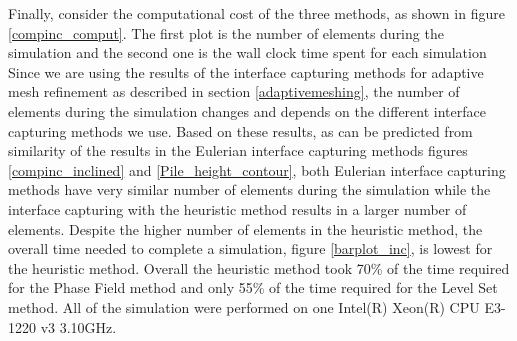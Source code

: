 \documentclass[letterpaper,10pt]{article}
\begin{document}
Finally, consider the computational cost of the three methods, as shown in figure \ref{compinc_comput}.
The first plot is the number of elements during the simulation and the second one is the wall clock time spent for each simulation
Since we are using the results of the interface capturing methods for adaptive mesh refinement as described in section \ref{adaptivemeshing}, 
the number of elements during the simulation changes and depends on the different interface capturing methods we use. 
Based on these results, as can be predicted from similarity of the results in the Eulerian interface capturing methods figures \ref{compinc_inclined} 
and \ref{Pile_height_contour}, both Eulerian interface capturing methods have very similar number of elements during the simulation while the 
interface capturing with the heuristic method results in a larger number of elements. 
Despite the higher number of elements in the heuristic method, the overall time needed to complete a simulation, figure \ref{barplot_inc},
is lowest for the heuristic method. Overall the heuristic method took 70\% of the time required for the Phase Field method and only 55\% 
of the time required for the Level Set method.
All of the simulation were performed on one Intel(R) Xeon(R) CPU E3-1220 v3 3.10GHz.

\end{document}
